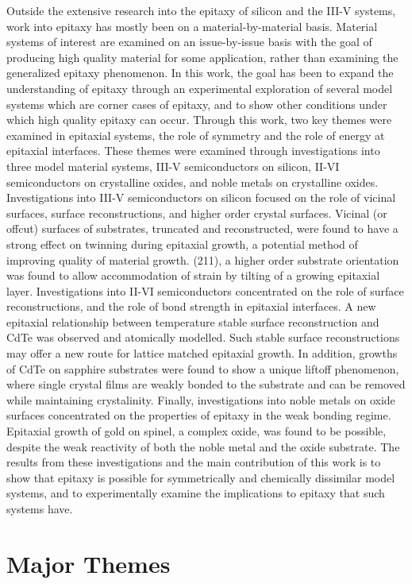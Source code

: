 Outside the extensive research into the epitaxy of silicon and the III-V systems, work into epitaxy has mostly been on a material-by-material basis.
Material systems of interest are examined on an issue-by-issue basis with the goal of producing high quality material for some application, rather than examining the generalized epitaxy phenomenon.
In this work, the goal has been to expand the understanding of epitaxy through an experimental exploration of several model systems which are corner cases of epitaxy, and to show other conditions under which high quality epitaxy can occur.
Through this work, two key themes were examined in epitaxial systems, the role of symmetry and the role of energy at epitaxial interfaces.
These themes were examined through investigations into three model material systems, III-V semiconductors on silicon, II-VI semiconductors on crystalline oxides, and noble metals on crystalline oxides.
Investigations into III-V semiconductors on silicon focused on the role of vicinal surfaces, surface reconstructions, and higher order crystal surfaces.
Vicinal (or offcut) surfaces of substrates, truncated and reconstructed, were found to have a strong effect on twinning during epitaxial growth, a potential method of improving quality of material growth.
(211), a higher order substrate orientation was found to allow accommodation of strain by tilting of a growing epitaxial layer.
Investigations into II-VI semiconductors concentrated on the role of surface reconstructions, and the role of bond strength in epitaxial interfaces.
A new epitaxial relationship between temperature stable surface reconstruction and CdTe was observed and atomically modelled.
Such stable surface reconstructions may offer a new route for lattice matched epitaxial growth.
In addition, growths of CdTe on sapphire substrates were found to show a unique liftoff phenomenon, where single crystal films are weakly bonded to the substrate and can be removed while maintaining crystalinity.
Finally, investigations into noble metals on oxide surfaces concentrated on the properties of epitaxy in the weak bonding regime.
Epitaxial growth of gold on spinel, a complex oxide, was found to be possible, despite the weak reactivity of both the noble metal and the oxide substrate.
The results from these investigations and the main contribution of this work is to show that epitaxy is possible for symmetrically and chemically dissimilar model systems, and to experimentally examine the implications to epitaxy that such systems have.

\section{Major Themes}
